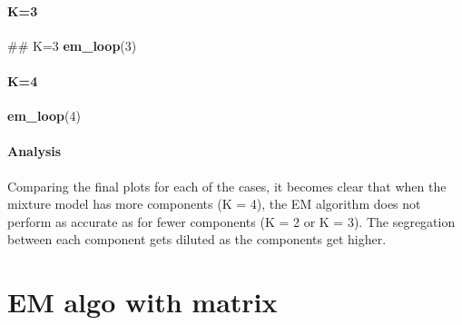 \documentclass[]{article}
\newenvironment{Shaded}{\begin{snugshade}}{\end{snugshade}}
\newcommand{\KeywordTok}[1]{\textcolor[rgb]{0.13,0.29,0.53}{\textbf{#1}}}
\newcommand{\DecValTok}[1]{\textcolor[rgb]{0.00,0.00,0.81}{#1}}
\newcommand{\NormalTok}[1]{#1}
\let\oldparagraph\paragraph
\renewcommand{\paragraph}[1]{\oldparagraph{#1}\mbox{}}
\begin{document}
\paragraph{K=3}\label{k3}

\begin{Shaded}
\begin{Highlighting}[]
\NormalTok{## K=3}
\KeywordTok{em_loop}\NormalTok{(}\DecValTok{3}\NormalTok{)}
\end{Highlighting}
\end{Shaded}

\paragraph{K=4}\label{k4}

\begin{Shaded}
\begin{Highlighting}[]
\KeywordTok{em_loop}\NormalTok{(}\DecValTok{4}\NormalTok{)}
\end{Highlighting}
\end{Shaded}

\paragraph{Analysis}\label{analysis}

Comparing the final plots for each of the cases, it becomes clear that
when the mixture model has more components (K = 4), the EM algorithm
does not perform as accurate as for fewer components (K = 2 or K = 3).
The segregation between each component gets diluted as the components
get higher.

\section{EM algo with matrix}\label{em-algo-with-matrix}
\end{document}
